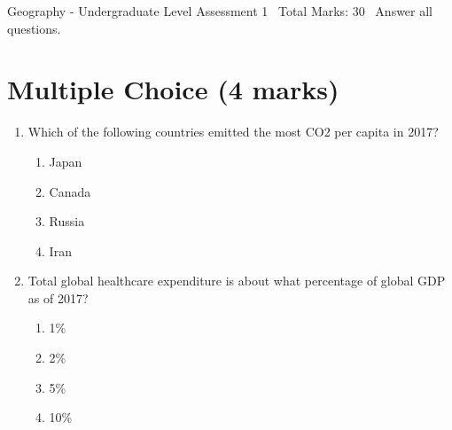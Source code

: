 \documentclass[12pt]{article}
\begin{document}
\begin{center}
Geography - Undergraduate Level Assessment 1 \
Total Marks: 30 \
Answer all questions.
\end{center}

\section*{Multiple Choice (4 marks)}
\begin{enumerate}[label=\arabic*.]
\item Which of the following countries emitted the most CO2 per capita in 2017?
\begin{enumerate}[label=(\alph*)]
    \item Japan
    \item Canada
    \item Russia
    \item Iran
\end{enumerate}
\item Total global healthcare expenditure is about what percentage of global GDP as of 2017?
\begin{enumerate}[label=(\alph*)]
    \item 1\%
    \item 2\%
    \item 5\%
    \item 10\%
\end{enumerate}
\end{enumerate}
\end{document}
